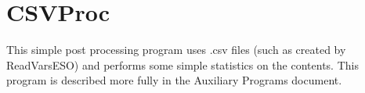 \section{CSVProc}\label{csvproc}

This simple post processing program uses .csv files (such as created by ReadVarsESO) and performs some simple statistics on the contents. This program is described more fully in the Auxiliary Programs document.
